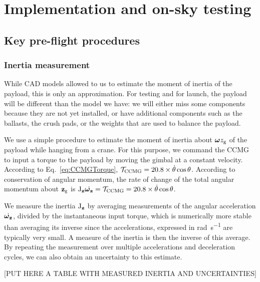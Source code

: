 
\chapter[Implementation and on-sky testing]{Implementation and on-sky testing} %



\section{Key pre-flight procedures}
\subsection{Inertia measurement}
While CAD models allowed to us to estimate the moment of inertia of the payload, this is only an approximation. For testing and for launch, the payload will be different than the model we have: we will either miss some components because they are not yet installed, or have additional components such as the ballasts, the crush pads, or the weights that are used to balance the payload.

We use a simple procedure to estimate the moment of inertia about $\boldsymbol\omega{z}_{\textrm{g}}$ of the payload while hanging from a crane. For this purpose, we command the CCMG to input a torque to the payload by moving the gimbal at a constant velocity. According to Eq.~\ref{eq:CCMGTorque}, $\mathcal{T}_{\textrm{CCMG}} =  20.8\times \dot{\theta}\cos\theta$. According to conservation of angular momentum, the rate of change of the total angular momentum about $\textrm{\textbf{z}}_{\textrm{g}}$ is $\textrm{J}_{\textrm{\textbf{z}}}\dot{\boldsymbol\omega_{\textrm{\textbf{z}}}} = \mathcal{T}_{\textrm{CCMG}} = 20.8\times \dot{\theta}\cos\theta$.

We measure the inertia $\textrm{J}_{\textrm{\textbf{z}}}$ by averaging measurements of the angular acceleration $\dot{\boldsymbol\omega_{\textrm{\textbf{z}}}}$, divided by the instantaneous input torque, which is numerically more stable than averaging its inverse since the accelerations, expressed in \si{\radian\per\second} are typically very small. A measure of the inertia is then the inverse of this average. By repeating the measurement over multiple accelerations and deceleration cycles, we can also obtain an uncertainty to this estimate.

[PUT HERE A TABLE WITH MEASURED INERTIA AND UNCERTAINTIES]

